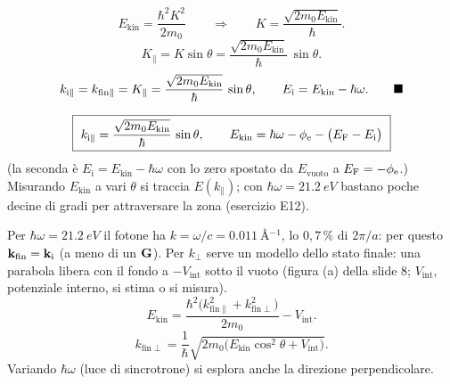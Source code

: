 \documentclass[11pt,a4paper]{article}
\begin{document}
\begin{dimostrazione}
\[
E_{\mathrm{kin}}=\frac{\hbar^2K^2}{2m_0}\qquad\Longrightarrow\qquad K=\frac{\sqrt{2m_0E_{\mathrm{kin}}}}\hbar .
\]
\[
K_\parallel=K\sin\theta=\frac{\sqrt{2m_0E_{\mathrm{kin}}}}\hbar\,\sin\theta .
\]
\[
k_{\mathrm i\parallel}=k_{\mathrm{fin}\parallel}=K_\parallel=\frac{\sqrt{2m_0E_{\mathrm{kin}}}}\hbar\,\sin\theta,\qquad
E_{\mathrm i}=E_{\mathrm{kin}}-\hbar\omega .\qed
\]
\end{dimostrazione}

\begin{chiave}
\[
\boxed{\ k_{\mathrm i\parallel}=\frac{\sqrt{2m_0E_{\mathrm{kin}}}}\hbar\,\sin\theta,\qquad
E_{\mathrm{kin}}=\hbar\omega-\phi_{\mathrm e}-\bigl(E_{\mathrm F}-E_{\mathrm i}\bigr)\ }
\]
(la seconda è $E_{\mathrm i}=E_{\mathrm{kin}}-\hbar\omega$ con lo zero spostato da $E_{\mathrm{vuoto}}$ a $E_{\mathrm F}=-\phi_{\mathrm e}$.) Misurando
$E_{\mathrm{kin}}$ a vari $\theta$ si traccia $E(k_\parallel)$; con $\hbar\omega=\SI{21.2}{eV}$ bastano poche decine di gradi per attraversare la zona
(esercizio E12).
\end{chiave}

\begin{approfondimento}
Per $\hbar\omega=\SI{21.2}{eV}$ il fotone ha $k=\omega/c=\SI{0.011}{\angstrom^{-1}}$, lo $0{,}7\,\%$ di $2\pi/a$: per questo $\mathbf k_{\mathrm{fin}}=
\mathbf k_{\mathrm i}$ (a meno di un $\mathbf G$). Per $k_\perp$ serve un modello dello stato finale: una parabola libera con il fondo a $-V_{\mathrm{int}}$
sotto il vuoto (figura (a) della slide 8; $V_{\mathrm{int}}$, potenziale interno, si stima o si misura).
\[
E_{\mathrm{kin}}=\frac{\hbar^2\bigl(k_{\mathrm{fin}\parallel}^2+k_{\mathrm{fin}\perp}^2\bigr)}{2m_0}-V_{\mathrm{int}} .
\]
\[
k_{\mathrm{fin}\perp}=\frac1\hbar\sqrt{2m_0\bigl(E_{\mathrm{kin}}\cos^2\theta+V_{\mathrm{int}}\bigr)} .
\]
Variando $\hbar\omega$ (luce di sincrotrone) si esplora anche la direzione perpendicolare.
\end{approfondimento}
\end{document}
